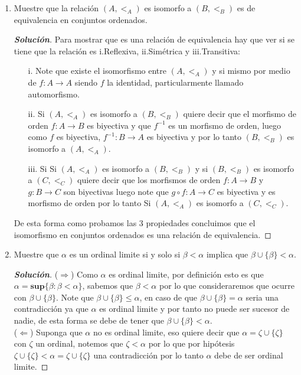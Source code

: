 \documentclass[11pt]{article}
\numberwithin{equation}{section}
\numberwithin{figure}{section}
\begin{document}
\begin{enumerate}
\begin{proof}[\textbf{Solución}]
    \end{proof}
    \item Muestre que la relación $(A,<_A)$ es isomorfo a $(B,<_B)$ es de equivalencia en conjuntos ordenados.
    \begin{proof}[\textbf{Solución}]
    Para mostrar que es una relación de equivalencia hay que ver si se tiene que la relación es i.Reflexiva, ii.Simétrica y iii.Transitiva:
    \begin{itemize}
        \item[i.]Note que existe el isomorfismo entre $(A,<_A)$ y si mismo por medio de $f:A\longrightarrow A$ siendo $f$ la identidad, particularmente llamado automorfismo.
        \item[ii.]Si $(A,<_A)$ es isomorfo a $(B,<_B)$ quiere decir que el morfismo de orden $f:A\longrightarrow B$ es biyectiva y que $f^{-1}$ es un morfismo de orden, luego como $f$ es biyectiva, $f^{-1}:B\longrightarrow A$ es biyectiva y por lo tanto $(B,<_B)$ es isomorfo a $(A,<_A)$.
        \item[iii.]Si Si $(A,<_A)$ es isomorfo a $(B,<_B)$ y si $(B,<_B)$ es isomorfo a $(C,<_C)$ quiere decir que los morfismos de orden $f:A\longrightarrow B$ y $g:B\longrightarrow C$ son biyectivas luego note que $g\circ f:A\longrightarrow C$ es biyectiva y es morfismo de orden por lo tanto Si $(A,<_A)$ es isomorfo a $(C,<_C)$.
    \end{itemize}
    De esta forma como probamos las 3 propiedades concluimos que el isomorfismo en conjuntos ordenados es una relación de equivalencia.
    \end{proof}
    \item Muestre que $\alpha$ es un ordinal limite si y solo si $\beta<\alpha$ implica que $\beta\cup\{\beta\}<\alpha$.
    \begin{proof}[\textbf{Solución}]
    ($\Rightarrow$) Como $\alpha$ es ordinal limite, por definición esto es que $\alpha=\textbf{sup}\{\beta:\beta<\alpha\}$, sabemos que $\beta<\alpha$ por lo que consideraremos que ocurre con $\beta\cup\{\beta\}$. Note que $\beta\cup\{\beta\}\leq\alpha$, en caso de que $\beta\cup\{\beta\}=\alpha$ seria una contradicción ya que $\alpha$ es ordinal limite y por tanto no puede ser sucesor de nadie, de esta forma se debe de tener que $\beta\cup\{\beta\}<\alpha$.\\
    ($\Leftarrow$) Suponga que $\alpha$ no es ordinal limite, eso quiere decir que $\alpha=\zeta\cup\{\zeta\}$ con $\zeta$ un ordinal, notemos que $\zeta<\alpha$ por lo que por hipótesis $\zeta\cup\{\zeta\}<\alpha=\zeta\cup\{\zeta\}$ una contradicción por lo tanto $\alpha$ debe de ser ordinal limite.

\end{proof}
\end{enumerate}
\end{document}
